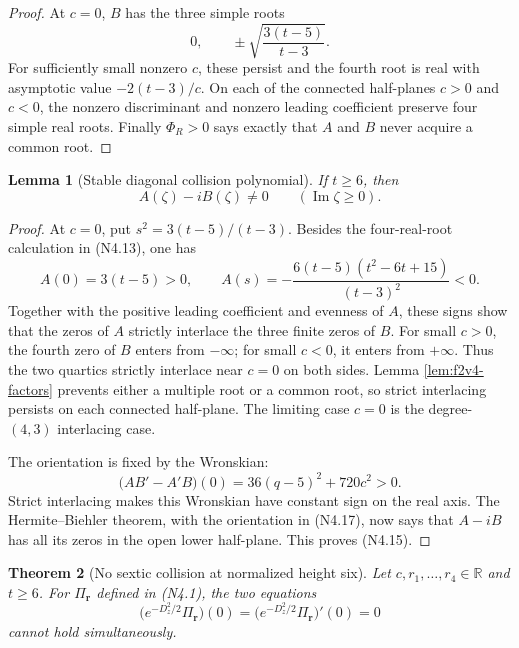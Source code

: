 \documentclass[11pt]{article}
\newtheorem{theorem}{Theorem}[section]
\newtheorem{lemma}[theorem]{Lemma}
\theoremstyle{definition}
\theoremstyle{remark}
\begin{document}
\begin{proof}
At \(c=0\), \(B\) has the three simple roots
\[
 0,\qquad \pm\sqrt{\frac{3(t-5)}{t-3}}.
 \tag{N4.14}
\]
For sufficiently small nonzero \(c\), these persist and the fourth root is
real with asymptotic value \(-2(t-3)/c\).  On each of the connected
half-planes \(c>0\) and \(c<0\), the nonzero discriminant and nonzero leading
coefficient preserve four simple real roots.  Finally
\(\Phi_R>0\) says exactly that \(A\) and \(B\) never acquire a common root.
\end{proof}

\begin{lemma}[Stable diagonal collision polynomial]
\label{lem:f2v4-hb}
If \(t\ge6\), then
\[
 A(\zeta)-iB(\zeta)\ne0
 \qquad(\operatorname{Im}\zeta\ge0).
 \tag{N4.15}
\]
\end{lemma}

\begin{proof}
At \(c=0\), put \(s^2=3(t-5)/(t-3)\).  Besides the four-real-root
calculation in \textup{(N4.13)}, one has
\[
 A(0)=3(t-5)>0,\qquad
 A(s)=-\frac{6(t-5)(t^2-6t+15)}{(t-3)^2}<0.
 \tag{N4.16}
\]
Together with the positive leading coefficient and evenness of \(A\), these
signs show that the zeros of \(A\) strictly interlace the three finite zeros
of \(B\).  For small \(c>0\), the fourth zero of \(B\) enters from
\(-\infty\); for small \(c<0\), it enters from \(+\infty\).  Thus the two
quartics strictly interlace near \(c=0\) on both sides.  Lemma
\ref{lem:f2v4-factors} prevents either a multiple root or a common root, so
strict interlacing persists on each connected half-plane.  The limiting
case \(c=0\) is the degree-\((4,3)\) interlacing case.

The orientation is fixed by the Wronskian:
\[
 \bigl(AB'-A'B\bigr)(0)
 =36(q-5)^2+720c^2>0.
 \tag{N4.17}
\]
Strict interlacing makes this Wronskian have constant sign on the real
axis.  The Hermite--Biehler theorem, with the orientation in
\textup{(N4.17)}, now says that \(A-iB\) has all its zeros in the open
lower half-plane.  This proves \textup{(N4.15)}.
\end{proof}

\begin{theorem}[No sextic collision at normalized height six]
\label{thm:f2v4-sextic}
Let \(c,r_1,\ldots,r_4\in\mathbb R\) and \(t\ge6\).  For
\(\Pi_{\boldsymbol r}\) defined in \textup{(N4.1)}, the two equations
\[
 \bigl(e^{-D_z^2/2}\Pi_{\boldsymbol r}\bigr)(0)=
 \bigl(e^{-D_z^2/2}\Pi_{\boldsymbol r}\bigr)'(0)=0
 \tag{N4.18}
\]
cannot hold simultaneously.
\end{theorem}
\end{document}
